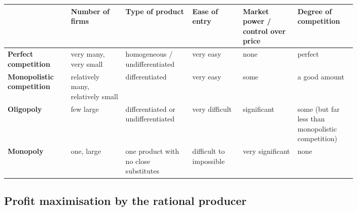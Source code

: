 \begin{center}
\renewcommand{\arraystretch}{1.6}
\begin{tabular}{|p{0.14\linewidth}|p{0.13\linewidth}|p{0.15\linewidth}|p{0.12\linewidth}|p{0.13\linewidth}|p{0.13\linewidth}|}
\hline
 & \textbf{Number of firms} & \textbf{Type of product} & \textbf{Ease of entry} & \textbf{Market power / control over price} & \textbf{Degree of competition} \\
\hline
\textbf{Perfect competition} & very many, very small & homogeneous / undifferentiated & very easy & none & perfect \\
\hline
\textbf{Monopolistic competition} & relatively many, relatively small & differentiated & very easy & some & a good amount \\
\hline
\textbf{Oligopoly} & few large & differentiated or undifferentiated & very difficult & significant & some (but far less than monopolistic competition) \\
\hline
\textbf{Monopoly} & one, large & one product with no close substitutes & difficult to impossible & very significant & none \\
\hline
\end{tabular}
\end{center}
\subsection{Profit maximisation by the rational producer}

